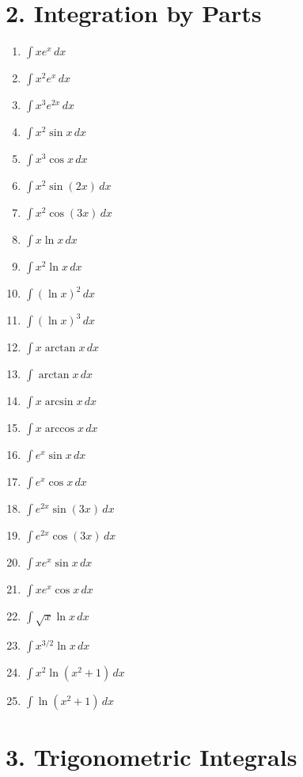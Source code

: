 \documentclass[11pt]{article}
\begin{document}
\section*{2. Integration by Parts}

\begin{enumerate}
\item $\displaystyle \int xe^x\,dx$
\item $\displaystyle \int x^2e^x\,dx$
\item $\displaystyle \int x^3e^{2x}\,dx$
\item $\displaystyle \int x^2\sin x\,dx$
\item $\displaystyle \int x^3\cos x\,dx$
\item $\displaystyle \int x^2\sin(2x)\,dx$
\item $\displaystyle \int x^2\cos(3x)\,dx$
\item $\displaystyle \int x\ln x\,dx$
\item $\displaystyle \int x^2\ln x\,dx$
\item $\displaystyle \int (\ln x)^2\,dx$
\item $\displaystyle \int (\ln x)^3\,dx$
\item $\displaystyle \int x\arctan x\,dx$
\item $\displaystyle \int \arctan x\,dx$
\item $\displaystyle \int x\arcsin x\,dx$
\item $\displaystyle \int x\arccos x\,dx$
\item $\displaystyle \int e^x\sin x\,dx$
\item $\displaystyle \int e^x\cos x\,dx$
\item $\displaystyle \int e^{2x}\sin(3x)\,dx$
\item $\displaystyle \int e^{2x}\cos(3x)\,dx$
\item $\displaystyle \int x e^x\sin x\,dx$
\item $\displaystyle \int x e^x\cos x\,dx$
\item $\displaystyle \int \sqrt{x}\ln x\,dx$
\item $\displaystyle \int x^{3/2}\ln x\,dx$
\item $\displaystyle \int x^2\ln(x^2+1)\,dx$
\item $\displaystyle \int \ln(x^2+1)\,dx$
\end{enumerate}

\section*{3. Trigonometric Integrals}
\end{document}
